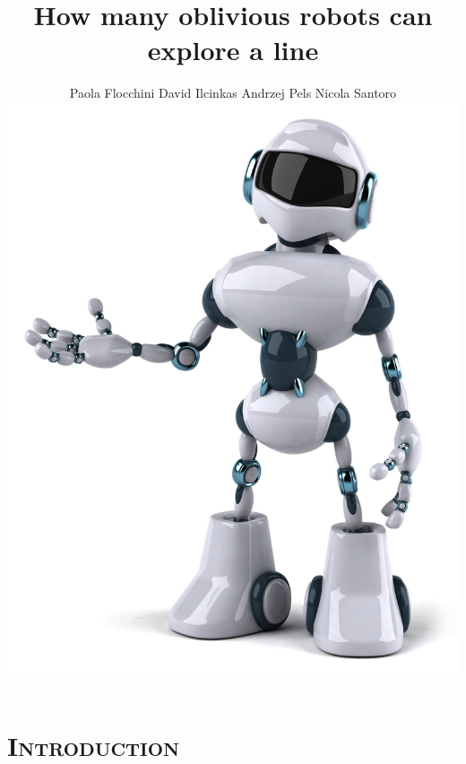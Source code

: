 \documentclass[xcolor=x11names,compress]{beamer}
\renewcommand{\(}{\begin{columns}}
\renewcommand{\)}{\end{columns}}
\newcommand{\<}[1]{\begin{column}{#1}}
\renewcommand{\>}{\end{column}}
\begin{document}
\section{\scshape Introduction}
\begin{frame}
\title{How many oblivious robots can explore a line}
\author{
	Paola Flocchini  David Ilcinkas  Andrzej Pels  Nicola Santoro\\
	\vspace{24pt} 
	\includegraphics[width=1\textwidth,right]{robot1.jpg}
}
\titlepage
\end{frame}

\end{document}
